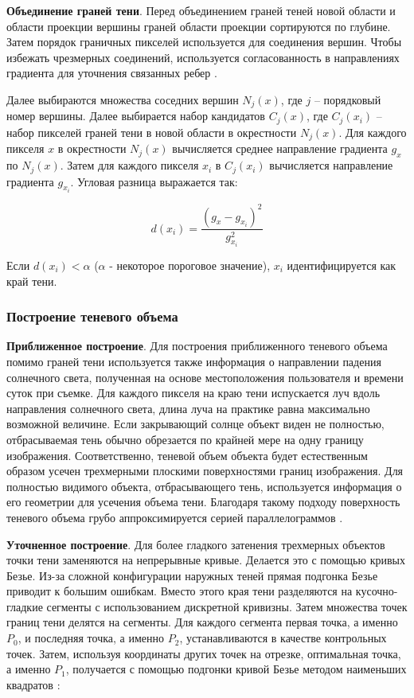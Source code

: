 \textbf{Объединение граней тени}. Перед объединением граней теней новой области и области проекции вершины граней области проекции сортируются по глубине. Затем порядок граничных пикселей используется для соединения вершин. Чтобы избежать чрезмерных соединений, используется согласованность в направлениях градиента для уточнения связанных ребер \cite{wei2019simulating}.

Далее выбираются множества соседних вершин $N_j(x)$, где $j$ -- порядковый номер вершины. Далее выбирается набор кандидатов $C_j(x)$, где $C_j(x_i)$ -- набор пикселей граней тени в новой области в окрестности $N_j(x)$. Для каждого пикселя $x$ в окрестности $N_j(x)$ вычисляется среднее направление градиента $g_x$ по $N_j(x)$. Затем для каждого пикселя $x_i$ в $C_j(x_i)$ вычисляется направление градиента $g_{x_i}$. Угловая разница выражается так:

\begin{equation}
	d(x_i) = \frac{(g_x - g_{x_i}) ^ 2}{g_{x_i} ^ 2}
\end{equation}

Если $d(x_i) < \alpha$ ($\alpha$ - некоторое пороговое значение), $x_i$ идентифицируется как край тени.

\subsubsection*{Построение теневого объема}

\textbf{Приближенное построение}. Для построения приближенного теневого объема помимо граней тени используется также информация о направлении падения солнечного света, полученная на основе местоположения пользователя и времени суток при съемке. Для каждого пикселя на краю тени испускается луч вдоль направления солнечного света, длина луча на практике равна максимально возможной величине. Если закрывающий солнце объект виден не полностью, отбрасываемая тень обычно обрезается по крайней мере на одну границу изображения. Соответственно,  теневой объем объекта будет естественным образом усечен трехмерными плоскими поверхностями границ изображения. Для полностью видимого объекта, отбрасывающего тень, используется информация о его геометрии для усечения объема тени. Благодаря такому подходу поверхность теневого объема грубо аппроксимируется серией параллелограммов \cite{wei2019simulating}.

\textbf{Уточненное построение}. Для более гладкого затенения трехмерных объектов точки тени заменяются на непрерывные кривые. Делается это с помощью кривых Безье. Из-за сложной конфигурации наружных теней прямая подгонка Безье приводит к большим ошибкам. Вместо этого края тени разделяются на кусочно-гладкие сегменты с использованием дискретной кривизны. Затем множества точек границ тени делятся на сегменты. Для каждого сегмента первая точка, а именно $P_0$, и последняя точка, а именно $P_2$, устанавливаются в качестве контрольных точек. Затем, используя координаты других точек на отрезке, оптимальная точка, а именно $P_1$, получается с помощью подгонки кривой Безье методом наименьших квадратов \cite{wei2019simulating}:

